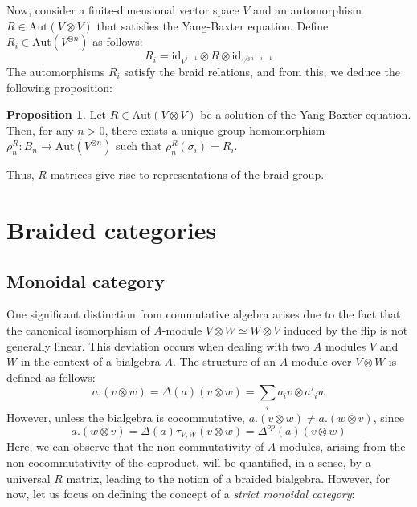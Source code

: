 \documentclass[11pt]{article}
\theoremstyle{definition}
\newtheorem{Prop}{Proposition}[section]
\begin{document}
Now, consider a finite-dimensional vector space \(V\) and an automorphism \(R \in \text{Aut}(V\otimes V)\) that satisfies the Yang-Baxter equation. Define \(R_i \in \text{Aut}(V^{\otimes n})\) as follows:
\[R_i = \text{id}_{V^{i-1}}\otimes R \otimes \text{id}_{V^{\otimes n-i-1}}\]
The automorphisms \(R_i\) satisfy the braid relations, and from this, we deduce the following proposition:

\begin{Prop}
Let \(R \in \text{Aut}(V\otimes V)\) be a solution of the Yang-Baxter equation. Then, for any \(n > 0\), there exists a unique group homomorphism \(\rho_n^{R}: B_n \to \text{Aut}(V^{\otimes n})\) such that \(\rho_n^{R}(\sigma_i) = R_i\).
\end{Prop}

Thus, \(R\) matrices give rise to representations of the braid group.

\section{\Large \textbf{Braided categories}}
\subsection{\Large \textbf{Monoidal category}}
One significant distinction from commutative algebra arises due to the fact that the canonical isomorphism of \(A\)-module \(V\otimes W\simeq W\otimes V\) induced by the flip is not generally linear. This deviation occurs when dealing with two \(A\) modules \(V\) and \(W\) in the context of a bialgebra \(A\). The structure of an \(A\)-module over \(V\otimes W\) is defined as follows:
\[a.(v\otimes w)=\Delta(a)(v\otimes w)=\sum_{i}a_{i}v\otimes a'_{i}w\]
However, unless the bialgebra is cocommutative, \(a.(v\otimes w)\neq a.(w\otimes v)\), since
\[a.(w\otimes v)=\Delta(a)\tau_{V,W}(v\otimes w)=\Delta^{op}(a)(v\otimes w)\]
Here, we can observe that the non-commutativity of \(A\) modules, arising from the non-cocommutativity of the coproduct, will be quantified, in a sense, by a universal \(R\) matrix, leading to the notion of a braided bialgebra. However, for now, let us focus on defining the concept of a \textit{strict monoidal category}:
\end{document}
